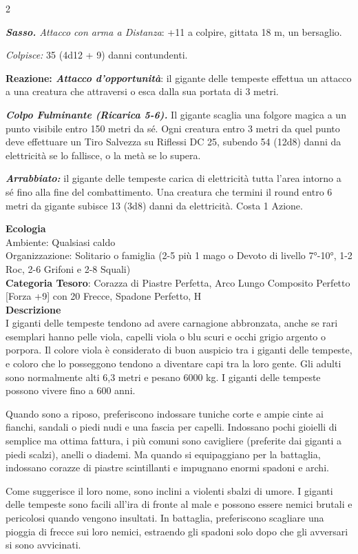 \begin{multicols}{2}
{\emph{\textbf{Sasso.} Attacco con arma a Distanza}: +11 a colpire, gittata 18 m, un bersaglio.

\emph{Colpisce:} 35 (4d12 + 9) danni contundenti.

\textbf{Reazione: \emph{Attacco d'opportunità}}: il gigante delle tempeste effettua un attacco a una creatura che attraversi o esca dalla sua portata di 3 metri.

\emph{\textbf{Colpo Fulminante (Ricarica 5-6).}} Il gigante scaglia una folgore magica a un punto visibile entro 150 metri da sé. Ogni creatura entro 3 metri da quel punto deve effettuare un Tiro Salvezza su Riflessi DC 25, subendo 54 (12d8) danni da elettricità se lo fallisce, o la metà se lo supera.

\emph{\textbf{Arrabbiato:}} il gigante delle tempeste carica di elettricità tutta l'area intorno a sé fino alla fine del combattimento. Una creatura che termini il round entro 6 metri da gigante subisce 13 (3d8) danni da elettricità. Costa 1 Azione.

\textbf{Ecologia}\\
Ambiente: Qualsiasi caldo\\
Organizzazione: Solitario o famiglia (2-5 più 1 mago o Devoto di livello 7°-10°, 1-2 Roc, 2-6 Grifoni e 2-8 Squali)\\
\textbf{Categoria Tesoro}: Corazza di Piastre Perfetta, Arco Lungo Composito Perfetto [Forza +9] con 20 Frecce, Spadone Perfetto, H\\
\textbf{Descrizione}\\
I giganti delle tempeste tendono ad avere carnagione abbronzata, anche se rari esemplari hanno pelle viola, capelli viola o blu scuri e occhi grigio argento o porpora. Il colore viola è considerato di buon auspicio tra i giganti delle tempeste, e coloro che lo posseggono tendono a diventare capi tra la loro gente. Gli adulti sono normalmente alti 6,3 metri e pesano 6000 kg. I giganti delle tempeste possono vivere fino a 600 anni.

Quando sono a riposo, preferiscono indossare tuniche corte e ampie cinte ai fianchi, sandali o piedi nudi e una fascia per capelli. Indossano pochi gioielli di semplice ma ottima fattura, i più comuni sono cavigliere (preferite dai giganti a piedi scalzi), anelli o diademi. Ma quando si equipaggiano per la battaglia, indossano corazze di piastre scintillanti e impugnano enormi spadoni e archi.

Come suggerisce il loro nome, sono inclini a violenti sbalzi di umore. I giganti delle tempeste sono facili all'ira di fronte al male e possono essere nemici brutali e pericolosi quando vengono insultati. In battaglia, preferiscono scagliare una pioggia di frecce sui loro nemici, estraendo gli spadoni solo dopo che gli avversari si sono avvicinati.

}
\end{multicols}
